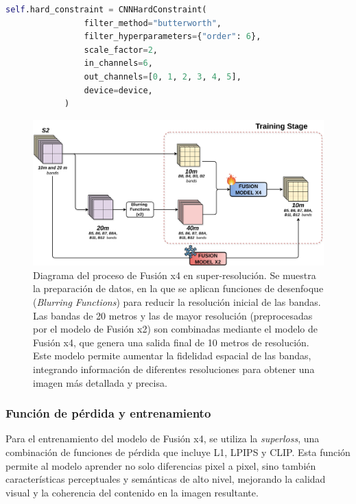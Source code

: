             \begin{lstlisting}[language=Python]
            self.hard_constraint = CNNHardConstraint(
                filter_method="butterworth",
                filter_hyperparameters={"order": 6},
                scale_factor=2,
                in_channels=6,
                out_channels=[0, 1, 2, 3, 4, 5],
                device=device,
            )
            \end{lstlisting}

            \begin{figure}[H]
                \centering
                \includegraphics[width=1\linewidth]{images/fusionx4_training.png}
                \caption{Diagrama del proceso de Fusión x4 en super-resolución. Se muestra la preparación de datos, en la que se aplican funciones de desenfoque (\textit{Blurring Functions}) para reducir la resolución inicial de las bandas. Las bandas de 20 metros y las de mayor resolución (preprocesadas por el modelo de Fusión x2) son combinadas mediante el modelo de Fusión x4, que genera una salida final de 10 metros de resolución. Este modelo permite aumentar la fidelidad espacial de las bandas, integrando información de diferentes resoluciones para obtener una imagen más detallada y precisa.}
                \label{fig:fusionx4_training}
            \end{figure}

        \subsubsection{Función de pérdida y entrenamiento}

            Para el entrenamiento del modelo de Fusión x4, se utiliza la \textit{superloss}, una combinación de funciones de pérdida que incluye L1, LPIPS y CLIP. Esta función permite al modelo aprender no solo diferencias pixel a pixel, sino también características perceptuales y semánticas de alto nivel, mejorando la calidad visual y la coherencia del contenido en la imagen resultante.

